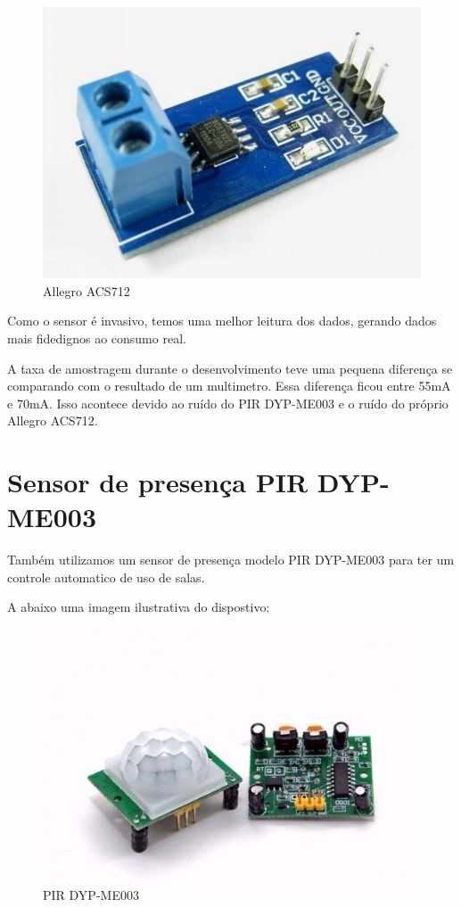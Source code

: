 \documentclass[openright]{normas-utf-tex} %
\begin{document}
\begin{figure}[!htb]
     \centering
     \includegraphics[scale=0.6]{AllegroACS712.jpg}
     \caption{Allegro ACS712}
     \label{fig:AllegreoACS712}
\end{figure}

Como o sensor é invasivo, temos uma melhor leitura dos dados, gerando dados mais fidedignos ao consumo real.

A taxa de amostragem durante o desenvolvimento teve uma pequena diferença se comparando com o resultado de um multimetro. Essa diferença ficou entre 55mA e 70mA. Isso acontece devido ao ruído do PIR DYP-ME003 e o ruído do próprio Allegro ACS712.

\section{Sensor de presença PIR DYP-ME003}

Também utilizamos um sensor de presença modelo PIR DYP-ME003   \cite{openimpulse}
para ter um controle automatico de uso de salas.

A abaixo uma imagem ilustrativa do dispostivo:
\begin{figure}[!htb]
     \centering
     \includegraphics[scale=0.6]{PIR.jpg}
     \caption{PIR DYP-ME003}
     \label{fig:PIR DYP-ME003}
\end{figure}
\end{document}
